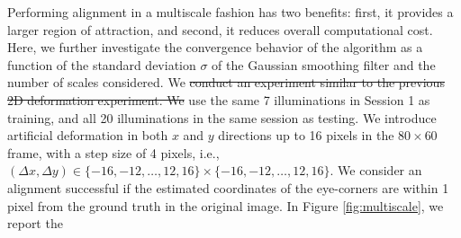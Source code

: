 \documentclass[12pt,journal,draftcls,letterpaper,onecolumn]{IEEEtran}
\providecommand{\DIFdel}[1]{{\protect\color{red}\sout{#1}}}                      %
\providecommand{\DIFaddend}{} %
\providecommand{\DIFdelbegin}{} %
\providecommand{\DIFdelend}{} %
\begin{document}
        \DIFaddend %
Performing alignment in a multiscale fashion has two benefits: first, it provides a larger region of attraction, and second, it reduces overall computational cost. Here, we further investigate the convergence behavior of the algorithm as a function of the standard deviation $\sigma$ of the Gaussian smoothing filter and the number of scales considered.
We \DIFdelbegin \DIFdel{conduct an experiment similar to the previous 2D
deformation experiment. We }\DIFdelend use the same 7 illuminations in
Session 1 as training, and all 20 illuminations in the same
session as testing. We introduce artificial deformation in
both $x$ and $y$ directions up to 16 pixels in the
$80\times 60$ frame, with a step size of 4 pixels, i.e.,
$(\Delta x, \Delta y) \in \{-16,-12,\ldots,12,16\} \times
\{-16,-12,\ldots,12,16\}$. We consider an alignment
successful if the estimated coordinates of the eye-corners
are within 1 pixel from the ground truth in the original
image.  In Figure \ref{fig:multiscale}, we report the
\end{document}
